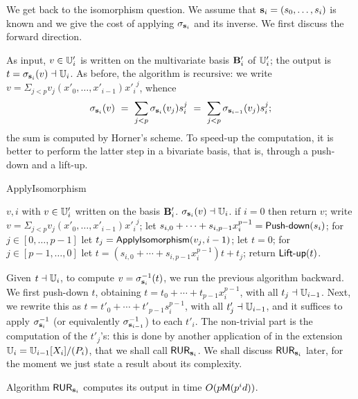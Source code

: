 We get back to the isomorphism question. We assume that
$\mathbf{s}_i=(s_0,\dots,s_i)$ is known and we give the cost of applying
$\sigma_{\mathbf{s}_i}$ and its inverse.  We first discuss the forward
direction.

As input, $v \in \mathbb{U}'_i$ is written on the multivariate basis $\mathbf{B}'_i$
of $\mathbb{U}'_i$; the output is $t=\sigma_{\mathbf{s}_i}(v) \dashv \mathbb{U}_i$. As before,
the algorithm is recursive: we write $v=\Sigma_{j <p}
v_j(x'_0,\dots,x'_{i-1}) {x'_i}^j$, whence
\begin{equation}
  \sigma_{\mathbf{s}_i}(v)\ =\ \sum_{j
    <p} \sigma_{\mathbf{s}_i}(v_j) s_i^j\ =\ \sum_{j
    <p} \sigma_{\mathbf{s}_{i-1}}(v_j) s_i^j
  \text{;}
\end{equation}
the sum is computed by Horner's scheme.  To speed-up the computation,
it is better to perform the latter step in a bivariate basis, that is,
through a push-down and a lift-up.


\begin{algorithm}
  \caption{ApplyIsomorphism} 
  \begin{algorithmic}[1]
    \REQUIRE $v,i$ with $v\in \mathbb{U}'_i$ written on the basis $\mathbf{B}'_i$.
    \ENSURE $\sigma_{\mathbf{s}_i}(v) \dashv \mathbb{U}_i$.
    \STATE if $i=0$ then return $v$;
    \STATE write $v=\Sigma_{j <p} v_j(x'_0,\dots,x'_{i-1}) {x'_i}^j$;
    \STATE let $s_{i,0}+\cdots+s_{i,p-1}x_i^{p-1}=\text{{\sf Push-down}}(s_i)$;
    \STATE for $j \in [0,\dots,p-1]$ let $t_j={\sf ApplyIsomorphism}(v_j,i-1)$;
    \STATE let $t=0$;
    \STATE  for $j \in [p-1,\dots,0]$ let $t=(s_{i,0}+\cdots+s_{i,p-1}x_i^{p-1})t+t_j$;
    \STATE return $\text{{\sf Lift-up}}(t)$.
  \end{algorithmic}
\end{algorithm}

Given $t \dashv \mathbb{U}_i$, to compute $v=\sigma_{\mathbf{s}_i}^{-1}(t)$, we run
the previous algorithm backward. We first push-down $t$, obtaining
$t=t_0 + \cdots + t_{p-1}x_i^{p-1}$, with all $t_j \dashv
\mathbb{U}_{i-1}$. Next, we rewrite this as $t=t'_0+\cdots +
t'_{p-1}s_i^{p-1}$, with all $t'_j \dashv \mathbb{U}_{i-1}$, and it suffices to
apply $\sigma_{\mathbf{s}_i}^{-1}$ (or equivalently
$\sigma_{\mathbf{s}_{i-1}}^{-1}$) to each $t'_i$. The non-trivial part is
the computation of the $t'_j$'s: this is done by another application
of  in the extension $\mathbb{U}_i= \mathbb{U}_{i-1}[X_i]/(P_i)$, that we
shall call ${\sf RUR}_{\mathbf{s}_i}$. We shall discuss
${\sf RUR}_{\mathbf{s}_i}$ later, for the moment we just state a result
about its complexity.

\begin{lemma}
  \label{th:rur-s}
  Algorithm ${\sf RUR}_{\mathbf{s}_i}$ computes its output in time
  $O(p\mathsf{M}(p^id))$.
\end{lemma}

